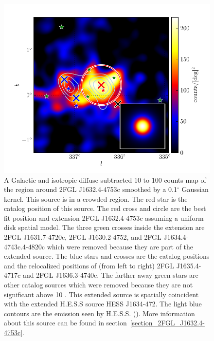 \documentclass[12pt,preprint]{aastex}
\newcommand{\gev}{\text{GeV}\xspace}
\newcommand{\tev}{\text{TeV}\xspace}
\renewcommand{\deg}{\ensuremath{^\circ}\xspace}
\begin{document}
\begin{figure}
  \begin{center}
    \includegraphics[type=pdf,ext=.pdf,read=.pdf]{source_plots/source_1FGL_J1632.9-4802c}
  \end{center}
  \caption{A Galactic and isotropic diffuse subtracted 10 \gev to 100
  \gev counts map of the region around 2FGL J1632.4-4753c smoothed by
  a 0.1\deg Gaussian kernel.  This source is in a crowded region.
  The red star is the catalog position of this source.  The red
  cross and circle are the best fit position and extension 2FGL
  J1632.4-4753c assuming a uniform disk spatial model.  The three
  green crosses inside the extension are 2FGL
  J1631.7-4720c, 2FGL J1630.2-4752, and 2FGL J1634.4-4743c.4-4820c
  which were removed because they are part
  of the extended source.  The blue stars and crosses are the catalog
  positions and the relocalized positions of (from left to right)
  2FGL J1635.4-4717c and 2FGL J1636.3-4740c.  The farther away green
  stars are other catalog sources which were removed 
  because they are not significant
  above 10 \gev.  This extended source is spatially coincident
  with the extended H.E.S.S source HESS J1634-472.  The light blue
  contours are the \tev emission seen by H.E.S.S. 
  (\cite{hess_plane_survey}). More information about this source 
  can be found in section~\ref{section_2FGL_J1632.4-4753c}.
  }\label{1FGL_J1632.9-4802c}
\end{figure}
\end{document}
